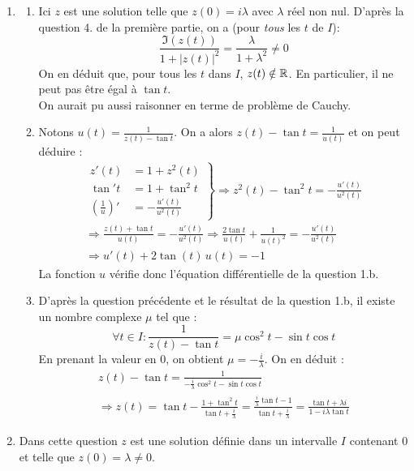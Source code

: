 \begin{enumerate}
\item \begin{enumerate}
 \item Ici $z$ est une solution telle que $z(0)=i\lambda$ avec $\lambda$ réel non nul. D'après la question 4. de la première partie, on a (pour \emph{tous} les $t$ de $I$):
\begin{displaymath}
 \frac{\Im(z(t))}{1+|z(t)|^2}=\frac{\lambda}{1+\lambda^2}\neq 0
\end{displaymath}
On en déduit que, pour tous les $t$ dans $I$, $z(t)\notin\mathbb{R}$. En particulier, il ne peut pas être égal à $\tan t$.\\
On aurait pu aussi raisonner en terme de problème de Cauchy.
\item Notons $u(t)=\frac{1}{z(t)-\tan t}$. On a alors $z(t)-\tan t =\frac{1}{u(t)}$ et on peut déduire :
\begin{multline*}
 \left. 
\begin{aligned}
 z'(t)&=1+z^2(t)\\
 \tan't &= 1+\tan^2 t\\
(\frac{1}{u})' &= -\frac{u'(t)}{u^2(t)}
\end{aligned} 
\right\rbrace 
\Rightarrow z^2(t)-\tan^2t=  -\frac{u'(t)}{u^2(t)}\\
\Rightarrow \frac{z(t)+\tan t}{u(t)} =  -\frac{u'(t)}{u^2(t)} 
\Rightarrow \frac{2\tan t}{u(t)} + \frac{1}{u(t)^2} =   -\frac{u'(t)}{u^2(t)}\\
\Rightarrow u'(t)+2\tan(t)\, u(t) = -1
\end{multline*}
La fonction $u$ vérifie donc l'équation différentielle de la question 1.b.
\item D'après la question précédente et le résultat de la question 1.b, il existe un nombre complexe $\mu$ tel que :
\begin{displaymath}
 \forall t\in I : \frac{1}{z(t) -\tan t} = \mu \cos^2t-\sin t \cos t
\end{displaymath}
En prenant la valeur en $0$, on obtient $\mu=-\frac{i}{\lambda}$. On en déduit :
\begin{multline*}
 z(t)-\tan t = \frac{1}{-\frac{i}{\lambda}\cos^2t - \sin t \cos t} \\
\Rightarrow z(t)= \tan t - \frac{1+\tan^2t}{\tan t +\frac{i}{\lambda}} 
=\frac{\frac{i}{\lambda}\tan t -1}{\tan t +\frac{i}{\lambda}}=\frac{\tan t + \lambda i}{1-i\lambda \tan t}
\end{multline*}
\end{enumerate}
\item Dans cette question $z$ est une solution définie dans un intervalle $I$ contenant $0$ et telle que $z(0)=\lambda\neq0$.

\end{enumerate}
